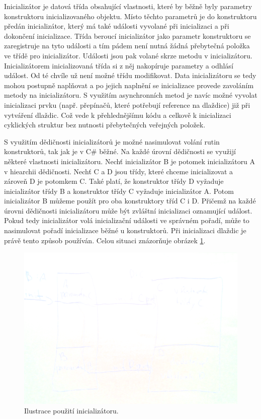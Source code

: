 Inicializátor je datová třída obsahující vlastnosti, které by běžně byly parametry konstruktoru inicializovaného objektu.
Místo těchto parametrů je do konstruktoru předán inicializátor, který má také události vyvolané
při inicializaci a při dokončení inicializace. Třída beroucí inicializátor jako parametr konstruktoru se zaregistruje na tyto události a
tím pádem není nutná žádná přebytečná položka ve třídě pro inicializátor. Události jsou pak volané skrze metodu v inicializátoru.
Inicializátorem inicializovaná třída si z něj nakopíruje parametry a odhlásí událost. Od té chvíle už není možné třídu modifikovat.
Data inicializátoru se tedy mohou postupně naplňovat a po jejich naplnění se inicializace provede zavoláním metody na inicializátoru.
S využitím asynchronních metod je navíc možné vyvolat inicializaci prvku (např. přepínačů, které potřebují reference na dlaždice) 
již při vytváření dlaždic. Což vede k přehlednějšímu kódu a celkově k inicializaci cyklických struktur bez nutnosti přebytečných 
veřejných položek. 

S využitím dědičnosti inicializátorů je možné nasimulovat volání rutin konstruktorů, tak jak je v C\#  běžné. Na každé úrovní dědičnosti
se využijí některé vlastnosti inicializátoru. Nechť inicializátor B
je potomek inicializátoru A v hiearchii dědičnosti. Nechť C a D jsou třídy, které chceme inicializovat a zároveň D je potomkem C.
Také platí, že konstruktor třídy D vyžaduje inicializátor třídy B a konstruktor třídy C vyžaduje inicializátor A. Potom inicializátor B můžeme
použít pro oba konstruktory tříd C i D. Přičemž na každé úrovni dědičnosti inicializátoru může být zvláštní inicializaci oznamující událost.
Pokud tedy inicializátor volá inicializační události ve správném pořadí, může to nasimulovat pořadí inicializace běžné u konstruktorů.
Při inicializaci dlaždic je právě tento způsob používán. Celou situaci znázorňuje obrázek \ref{initializer-inherence}.

\begin{figure}[H]\centering
\includegraphics[width=\textwidth]{./img/initializer-inherence.png}
\caption{Ilustrace použití inicializátoru.}
\label{initializer-inherence}
\end{figure}

